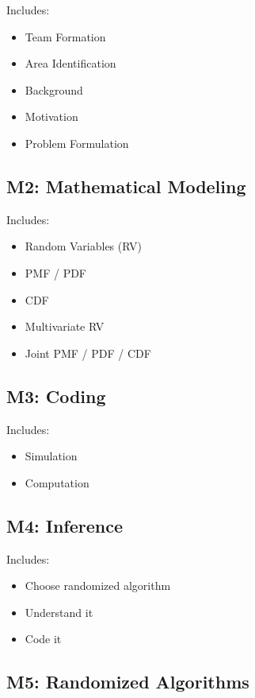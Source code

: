 \documentclass[12pt]{article}
\begin{document}
Includes:

\begin{itemize}
\item Team Formation
\item Area Identification
\item Background
\item Motivation
\item Problem Formulation
\end{itemize}

\subsection{M2: Mathematical Modeling}

Includes:

\begin{itemize}
\item Random Variables (RV)
\item PMF / PDF
\item CDF
\item Multivariate RV
\item Joint PMF / PDF / CDF
\end{itemize}

\subsection{M3: Coding}

Includes:

\begin{itemize}
\item Simulation
\item Computation
\end{itemize}

\subsection{M4: Inference}

Includes:

\begin{itemize}
\item Choose randomized algorithm
\item Understand it
\item Code it
\end{itemize}

\subsection{M5: Randomized Algorithms}
\end{document}
